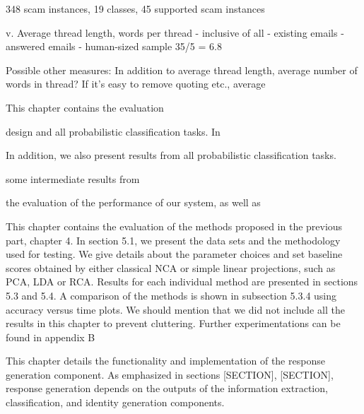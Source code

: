 348 scam instances, 19 classes, 45 supported scam instances



		v.  Average thread length, words per thread
			- inclusive of all
			- existing emails
			- answered emails
			- human-sized sample 35/5 = 6.8


Possible other measures: In addition to average thread length, average number of words in thread? If it's easy to remove quoting etc., average %






This chapter contains the evaluation 



design and all probabilistic classification tasks. In 

In addition, we also present results from all probabilistic classification tasks.

some intermediate results from 

the evaluation of the performance of our system, as well as 


This chapter contains the evaluation of the methods proposed in the previous
part, chapter 4. In section 5.1, we present the data sets and the methodology
used for testing. We give details about the parameter choices and set baseline
scores obtained by either classical NCA or simple linear projections, such as PCA,
LDA or RCA. Results for each individual method are presented in sections 5.3
and 5.4. A comparison of the methods is shown in subsection 5.3.4 using accuracy
versus time plots.
We should mention that we did not include all the results in this chapter to
prevent cluttering. Further experimentations can be found in appendix B

This chapter details the functionality and implementation of the response generation component. As emphasized in sections [SECTION], [SECTION], response generation depends on the outputs of the information extraction, classification, and identity generation components. 

